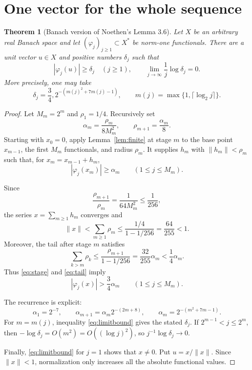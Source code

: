 \documentclass[11pt]{article}
\newtheorem{theorem}{Theorem}
\begin{document}
\section{One vector for the whole sequence}

\begin{theorem}[Banach version of Noethen's Lemma 3.6]\label{thm:sequence}
Let $X$ be an arbitrary real Banach space and let
$(\varphi_j)_{j\geq1}\subset X^*$ be norm-one functionals.  There are a unit
vector $u\in X$ and positive numbers $\delta_j$ such that
\[
 |\varphi_j(u)|\geq\delta_j\quad(j\geq1),
 \qquad
 \lim_{j\to\infty}\frac1j\log\delta_j=0.
\]
More precisely, one may take
\[
 \delta_j=\frac34,2^{-(m(j)^2+7m(j)-1)},
 \qquad
 m(j)=\max\{1,\lceil\log_2 j\rceil\}.
\]
\end{theorem}

\begin{proof}
Let $M_m=2^m$ and $\rho_1=1/4$.  Recursively set
\[
 \alpha_m=\frac{\rho_m}{8M_m^2},
 \qquad
 \rho_{m+1}=\frac{\alpha_m}{8}.
\]
Starting with $x_0=0$, apply Lemma~\ref{lem:finite} at stage $m$ to the
base point $x_{m-1}$, the first $M_m$ functionals, and radius $\rho_m$.
It supplies $h_m$ with $\|h_m\|<\rho_m$ such that, for
$x_m=x_{m-1}+h_m$,
\begin{equation}\label{eq:stage}
 |\varphi_j(x_m)|\geq\alpha_m
 \qquad(1\leq j\leq M_m).
\end{equation}

Since
\[
 \frac{\rho_{m+1}}{\rho_m}=\frac{1}{64M_m^2}\leq\frac1{256},
\]
the series $x=\sum_{m\geq1}h_m$ converges and
\[
 \|x\|<\sum_{m\geq1}\rho_m
 \leq \frac{1/4}{1-1/256}=\frac{64}{255}<1.
\]
Moreover, the tail after stage $m$ satisfies
\begin{equation}\label{eq:tail}
 \sum_{k>m}\rho_k
 \leq \frac{\rho_{m+1}}{1-1/256}
 =\frac{32}{255}\alpha_m
 <\frac14\alpha_m.
\end{equation}
Thus \eqref{eq:stage} and \eqref{eq:tail} imply
\begin{equation}\label{eq:limitbound}
 |\varphi_j(x)|>\frac34\alpha_m
 \qquad(1\leq j\leq M_m).
\end{equation}

The recurrence is explicit:
\[
 \alpha_1=2^{-7},
 \qquad
 \alpha_{m+1}=\alpha_m2^{-(2m+8)},
 \qquad
 \alpha_m=2^{-(m^2+7m-1)}.
\]
For $m=m(j)$, inequality \eqref{eq:limitbound} gives the stated $\delta_j$.
If $2^{m-1}<j\leq2^m$, then
$-\log\delta_j=O(m^2)=O((\log j)^2)$, so
$j^{-1}\log\delta_j\to0$.

Finally, \eqref{eq:limitbound} for $j=1$ shows that $x\neq0$.  Put
$u=x/\|x\|$.  Since $\|x\|<1$, normalization only increases all the
absolute functional values.
\end{proof}
\end{document}
